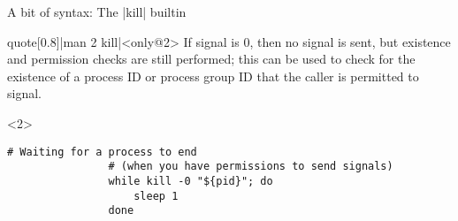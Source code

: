 \begin{frame}[fragile]{A bit of syntax: The \bash|kill| builtin}
\begin{overlayarea}{\textwidth}{0.7\textheight}
        \begin{varblock}{quote}[0.8\textwidth]{\bash|man 2 kill|}<only@2>
            If signal is 0, then no signal is sent, but existence and permission checks are still performed; this can be used to check for the existence of a process ID or process group ID that the caller is permitted to signal.
        \end{varblock}
        \begin{onlyenv}<2>
            \begin{lstlisting}[style=MyBash, aboveskip=2mm]
                # Waiting for a process to end
                # (when you have permissions to send signals)
                while kill -0 "${pid}"; do
                    sleep 1
                done
            \end{lstlisting}
        \end{onlyenv}
    \end{overlayarea}
\end{frame}
